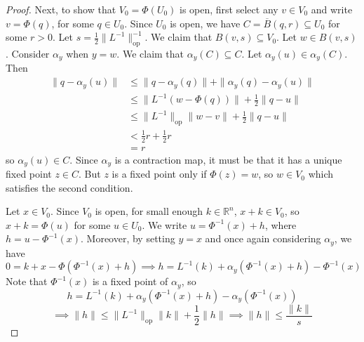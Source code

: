 \documentclass{article}
\newcommand{\op}{\mathrm{op}}
\newcommand{\cl}[1]{\overline{#1}}
\theoremstyle{plain} %
\numberwithin{thm}{section} %
\theoremstyle{definition}
\begin{document}
\begin{proof}
        Next, to show that \(V_0 = \Phi (U_0)\) is open, first select any \(v \in V_0\) and write \(v = \Phi (q)\), for some \(q \in U_0\). Since \(U_0\) is open, we have \(C = \cl{B}(q, r) \subseteq U_0\) for some \(r > 0\). Let \(s = \frac{1}{2}\|L^{-1} \| _{\op} ^{-1}\). We claim that \(B(v, s) \subseteq V_0\). Let \(w \in B(v,s)\). Consider \(\alpha _y\) when \(y = w\). We claim that \(\alpha _y (C) \subseteq C\). Let \(\alpha _y (u) \in \alpha _y(C)\). Then
        \begin{align*}
            \|q - \alpha _y(u)\| &\leq \|q - \alpha _y(q)\| + \|\alpha _y(q) - \alpha _y (u)\| \\
            &\leq \|L^{-1} (w - \Phi (q))\| + \frac{1}{2}\|q - u\| \\
            &\leq \|L^{-1} \| _{\op} \|w - v\| + \frac{1}{2}\|q - u\| \\
            &< \frac{1}{2}r + \frac{1}{2}r \\
            &= r
        \end{align*}
        so \(\alpha _y(u) \in C\). Since \(\alpha _y\) is a contraction map, it must be that it has a unique fixed point \(z \in C\). But \(z\) is a fixed point only if \(\Phi (z) = w\), so \(w \in V_0\) which satisfies the second condition.

        Let \(x \in V_0\). Since \(V_0\) is open, for small enough \(k \in \mathbb{R}^n\), \(x + k \in V_0\), so \(x + k = \Phi (u)\) for some \(u \in U_0\). We write \(u = \Phi^{-1} (x) + h\), where \(h = u - \Phi^{-1} (x)\). Moreover, by setting \(y = x\) and once again considering \(\alpha _y\), we have
        \[
            0 = k + x - \Phi (\Phi^{-1} (x) + h) \implies h = L^{-1} (k) + \alpha _y(\Phi^{-1} (x) + h) - \Phi^{-1} (x)
        \]
        Note that \(\Phi^{-1} (x)\) is a fixed point of \(\alpha _y\), so
        \[
            h = L^{-1} (k) + \alpha _y(\Phi^{-1} (x) + h) - \alpha _y(\Phi^{-1} (x))
        \]
        \[
            \implies \|h\| \leq \|L^{-1}\| _{\op} \|k\| + \frac{1}{2}\|h\| \implies \|h\| \leq \frac{\|k\|}{s}
        \]


\end{proof}
\end{document}
